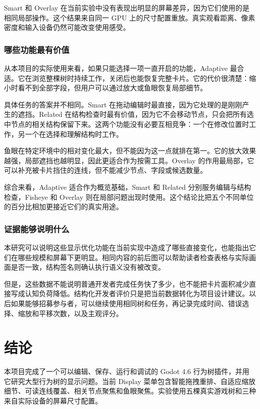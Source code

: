 \documentclass[11pt,a4paper,oneside,extrafontsizes]{memoir}
\begin{document}
Smart 和 Overlay 在当前实验中没有表现出明显的屏幕差异，因为它们使用的是相同局部操作。这个结果来自同一 GPU 上的尺寸配置重放。真实观看距离、像素密度和输入设备仍然可能改变使用感受。

\subsection{哪些功能最有价值}

从本项目的实际使用来看，如果只能选择一项一直开启的功能，Adaptive 最合适。它在浏览整棵树时持续工作，关闭后也能恢复完整卡片。它的代价很清楚：缩小时看不到全部字段，但用户可以通过放大或鱼眼恢复局部细节。

具体任务的答案并不相同。Smart 在拖动编辑时最直接，因为它处理的是刚刚产生的遮挡。Related 在结构检查时最有价值，因为它不会移动节点，只会把所有选中节点的相关结构保留下来。这两个功能没有必要互相竞争：一个在修改位置时工作，另一个在选择和理解结构时工作。

鱼眼在特定环境中的相对变化最大，但不能因为这一点就排在第一。它的放大效果越强，局部遮挡也越明显，因此更适合作为按需工具。Overlay 的作用最局部，它可以补充被卡片挡住的连线，但不能减少节点、字段或候选数量。

综合来看，Adaptive 适合作为概览基础，Smart 和 Related 分别服务编辑与结构检查，Fisheye 和 Overlay 则在局部问题出现时使用。这个结论比把五个不同单位的百分比相加更接近它们的真实用途。

\subsection{证据能够说明什么}

本研究可以说明这些显示优化功能在当前实现中造成了哪些直接变化，也能指出它们在哪些规模和屏幕下更明显。相同内容的前后图可以帮助读者检查表格与实际画面是否一致，结构签名则确认执行语义没有被改变。

但是，这些数据不能说明普通开发者完成任务快了多少，也不能把卡片面积减少直接写成认知负荷降低。结构化开发者评价只是把当前数据转化为项目设计建议。以后如果能够招募参与者，可以继续使用相同树和任务，再记录完成时间、错误选择、缩放和平移次数，以及主观评分。

\chapter{结论}

本项目完成了一个可以编辑、保存、运行和调试的 Godot 4.6 行为树插件，并用它研究大型行为树的显示问题。当前 Display 菜单包含智能拖拽重排、自适应缩放细节、可读连线覆盖、相关节点聚焦和鱼眼聚焦。实验使用五棵真实游戏树和三种来自实际设备的屏幕尺寸配置。
\end{document}
